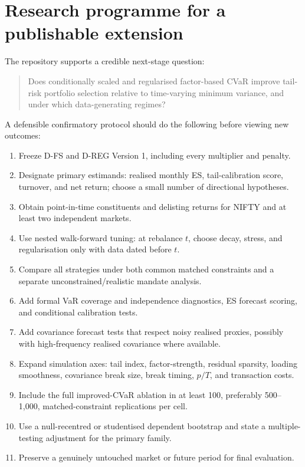 \documentclass[11pt,a4paper]{article}
\begin{document}
\section{Research programme for a publishable extension}

The repository supports a credible next-stage question:
\begin{quote}
Does conditionally scaled and regularised factor-based CVaR improve tail-risk portfolio selection relative to time-varying minimum variance, and under which data-generating regimes?
\end{quote}

A defensible confirmatory protocol should do the following before viewing new outcomes:

\begin{enumerate}
  \item Freeze D-FS and D-REG Version 1, including every multiplier and penalty.
  \item Designate primary estimands: realised monthly ES, tail-calibration score, turnover, and net return; choose a small number of directional hypotheses.
  \item Obtain point-in-time constituents and delisting returns for NIFTY and at least two independent markets.
  \item Use nested walk-forward tuning: at rebalance $t$, choose decay, stress, and regularisation only with data dated before $t$.
  \item Compare all strategies under both common matched constraints and a separate unconstrained/realistic mandate analysis.
  \item Add formal VaR coverage and independence diagnostics, ES forecast scoring, and conditional calibration tests.
  \item Add covariance forecast tests that respect noisy realised proxies, possibly with high-frequency realised covariance where available.
  \item Expand simulation axes: tail index, factor-strength, residual sparsity, loading smoothness, covariance break size, break timing, $p/T$, and transaction costs.
  \item Include the full improved-CVaR ablation in at least 100, preferably 500--1,000, matched-constraint replications per cell.
  \item Use a null-recentred or studentised dependent bootstrap and state a multiple-testing adjustment for the primary family.
  \item Preserve a genuinely untouched market or future period for final evaluation.
\end{enumerate}
\end{document}
